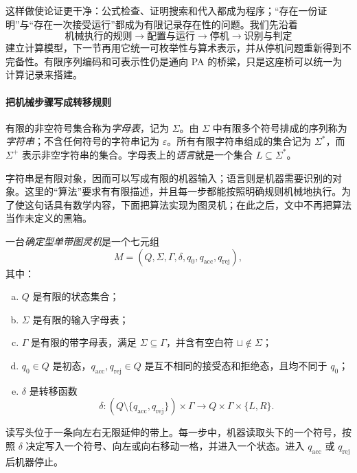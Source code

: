 \documentclass[lang=cn,a4paper,fontset=none,zihao=false,10pt,openany,twoside]{beautybook}
\numberwithin{algorithm}{chapter}
\begin{document}
这样做使论证更干净：公式检查、证明搜索和代入都成为程序；“存在一份证明”与“存在一次接受运行”都成为有限记录存在性的问题。我们先沿着
\[
 \text{机械执行的规则}\longrightarrow\text{配置与运行}
 \longrightarrow\text{停机}\longrightarrow\text{识别与判定}
\]
建立计算模型，下一节再用它统一可枚举性与算术表示，并从停机问题重新得到不完备性。有限序列编码和可表示性仍是通向 PA 的桥梁，只是这座桥可以统一为计算记录来搭建。

\paragraph{把机械步骤写成转移规则}

\begin{definition}
有限的非空符号集合称为\emph{字母表}，记为 $\Sigma$。由 $\Sigma$ 中有限多个符号排成的序列称为\emph{字符串}；不含任何符号的字符串记为 $\varepsilon$。所有有限字符串组成的集合记为 $\Sigma^*$，而 $\Sigma^+$ 表示非空字符串的集合。字母表上的\emph{语言}就是一个集合 $L\subseteq\Sigma^*$。
\end{definition}

字符串是有限对象，因而可以写成有限的机器输入；语言则是机器需要识别的对象。这里的“算法”要求有有限描述，并且每一步都能按照明确规则机械地执行。为了使这句话具有数学内容，下面把算法实现为图灵机；在此之后，文中不再把算法当作未定义的黑箱。

\begin{definition}[确定型单带图灵机]
一台\emph{确定型单带图灵机}是一个七元组
\[
 M=(Q,\Sigma,\Gamma,\delta,q_0,q_{\mathrm{acc}},q_{\mathrm{rej}}),
\]
其中：
\begin{enumerate}[(a)]
\item $Q$ 是有限的状态集合；
\item $\Sigma$ 是有限的输入字母表；
\item $\Gamma$ 是有限的带字母表，满足 $\Sigma\subseteq\Gamma$，并含有空白符 $\sqcup\notin\Sigma$；
\item $q_0\in Q$ 是初态，$q_{\mathrm{acc}},q_{\mathrm{rej}}\in Q$ 是互不相同的接受态和拒绝态，且均不同于 $q_0$；
\item $\delta$ 是转移函数
\[
 \delta:(Q\setminus\{q_{\mathrm{acc}},q_{\mathrm{rej}}\})\times\Gamma
 \longrightarrow Q\times\Gamma\times\{L,R\}.
\]
\end{enumerate}
读写头位于一条向左右无限延伸的带上。每一步中，机器读取头下的一个符号，按照 $\delta$ 决定写入一个符号、向左或向右移动一格，并进入一个状态。进入 $q_{\mathrm{acc}}$ 或 $q_{\mathrm{rej}}$ 后机器停止。
\end{definition}
\end{document}
